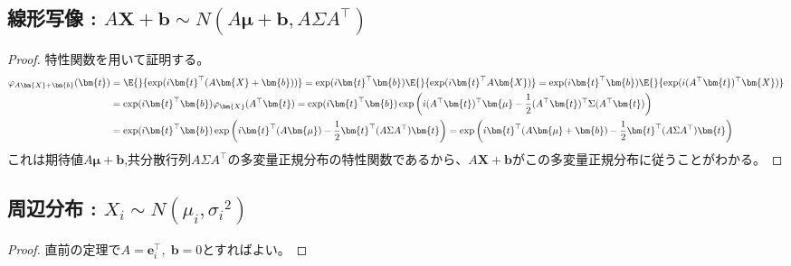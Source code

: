         \subsection{線形写像 : \texorpdfstring{$A\bm{X}+\bm{b} \sim N(A\bm{\mu}+\bm{b}, A\Sigma A^\top)$}{AX+b ～ N(Aμ+b, AΣA\string^T)}}
            \begin{proof}
                \quad\par
                特性関数を用いて証明する。
                \begin{align*}
                    \varphi_{A\bm{X}+\bm{b}}(\bm{t}) &= \E{}{\exp(i\bm{t}^\top(A\bm{X}+\bm{b}))} = \exp(i\bm{t}^\top\bm{b})\E{}{\exp(i\bm{t}^\top A\bm{X})} = \exp(i\bm{t}^\top\bm{b})\E{}{\exp(i(A^\top\bm{t})^\top\bm{X})} \\
                    &= \exp(i\bm{t}^\top\bm{b})\varphi_{\bm{X}}(A^\top\bm{t}) = \exp(i\bm{t}^\top\bm{b})\exp\left(i(A^\top\bm{t})^\top\bm{\mu} - \frac{1}{2}(A^\top\bm{t})^\top\Sigma(A^\top\bm{t})\right) \\
                    &= \exp(i\bm{t}^\top\bm{b})\exp\left(i\bm{t}^\top(A\bm{\mu}) - \frac{1}{2}\bm{t}^\top(A\Sigma A^\top)\bm{t}\right) = \exp\left(i\bm{t}^\top(A\bm{\mu}+\bm{b}) - \frac{1}{2}\bm{t}^\top(A\Sigma A^\top)\bm{t}\right)
                \end{align*}
                これは期待値$A\bm{\mu}+\bm{b}$,\;共分散行列$A\Sigma A^\top$の多変量正規分布の特性関数であるから、$A\bm{X}+\bm{b}$がこの多変量正規分布に従うことがわかる。
            \end{proof}
        \subsection{周辺分布 : \texorpdfstring{$X_i \sim N(\mu_i, {\sigma_i}^2)$}{Xi～N(μi, (σi)\string^2)}}
            \begin{proof}
                \quad 直前の定理で$A=\bm{e}_i^\top,\;\bm{b}=0$とすればよい。
            \end{proof}